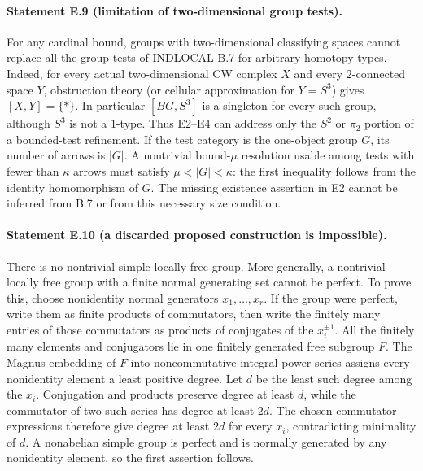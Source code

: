 \paragraph{Statement E.9 (limitation of two-dimensional group tests).}
For any cardinal bound, groups with two-dimensional
classifying spaces cannot replace all the group
tests of INDLOCAL B.7 for arbitrary homotopy types.
Indeed, for every actual two-dimensional CW
complex $X$ and every $2$-connected space $Y$,
obstruction theory (or cellular approximation
for $Y=S^3$) gives $[X,Y]=\{*\}$.
In particular $[BG,S^3]$ is a singleton for every
such group, although $S^3$ is not a $1$-type.
Thus E2--E4 can address only the $S^2$ or
$\pi_2$ portion of a bounded-test refinement.
If the test category is the one-object group
$G$, its number of arrows is $|G|$. A nontrivial
bound-$\mu$ resolution usable among tests with
fewer than $\kappa$ arrows must satisfy
$\mu<|G|<\kappa$: the first inequality follows
from the identity homomorphism of $G$. The
missing existence assertion in E2 cannot be
inferred from B.7 or from this necessary size
condition.

\paragraph{Statement E.10 (a discarded proposed construction is impossible).}
There is no nontrivial simple locally free group.
More generally, a nontrivial locally free group
with a finite normal generating set cannot be
perfect. To prove this, choose nonidentity normal
generators $x_1,\ldots,x_r$. If the group were
perfect, write them as finite products of
commutators, then write the finitely many entries
of those commutators as products of conjugates
of the $x_i^{\pm1}$. All the finitely many
elements and conjugators lie in one finitely
generated free subgroup $F$. The Magnus
embedding of $F$ into noncommutative integral
power series assigns every nonidentity element
a least positive degree. Let $d$ be the least
such degree among the $x_i$. Conjugation and
products preserve degree at least $d$, while
the commutator of two such series has degree
at least $2d$. The chosen commutator expressions
therefore give degree at least $2d$ for every
$x_i$, contradicting minimality of $d$.
A nonabelian simple group is perfect and is
normally generated by any nonidentity element,
so the first assertion follows.

